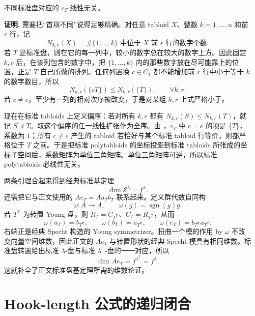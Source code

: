 \begin{lemma}
不同标准盘对应的 $\varepsilon_T$ 线性无关。

\par\smallskip\noindent\textbf{证明.}
需要把“首项不同”说得足够精确。对任意 tabloid $X$、整数 $k=1,\dots,n$ 和前 $r$ 行，记
\[
N_{k,r}(X)=\#\{1,\dots,k\}\text{ 中位于 }X\text{ 前 }r\text{ 行的数字个数}.
\]
若 $T$ 是标准盘，则在它的每一列中，较小的数字总在较大的数字上方。因此固定 $k,r$ 后，在该列包含的数字中，把 $\{1,\dots,k\}$ 内的那些数字放在尽可能靠上的位置，正是 $T$ 自己所做的排列。任何列置换 $c\in C_T$ 都不能增加前 $r$ 行中小于等于 $k$ 的数字数目，所以
\begin{equation}
N_{k,r}(\{cT\})\le N_{k,r}(\{T\}),
\qquad \forall k,r.
\label{eq:tabloid-dominance-triangular}
\end{equation}
若 $c\neq e$，至少有一列的相对次序被改变，于是对某组 $k,r$ 上式严格小于。

现在在标准 tabloids 上定义偏序：若对所有 $k,r$ 都有 $N_{k,r}(S)\le N_{k,r}(T)$，就记 $S\preceq T$。取这个偏序的任一线性扩张作为全序。由 ，$\varepsilon_T$ 中 $c=e$ 的项是 $\{T\}$，系数为 $1$；所有 $c\neq e$ 产生的 tabloid 若恰好与某个标准 tabloid 行等价，则都严格位于 $T$ 之前。于是把标准 polytabloids 的坐标投影到标准 tabloids 所张成的坐标子空间后，系数矩阵为单位三角矩阵。单位三角矩阵可逆，所以标准 polytabloids 必线性无关。
\end{lemma}

两条引理合起来得到经典标准基定理
\begin{equation}
\dim\mathscr S^\lambda=f^\lambda.
\label{eq:standard-polytabloid-dimension-app}
\end{equation}
还需把它与正文使用的 $Ae_T=Aa_Tb_T$ 联系起来。定义群代数自同构
\[
\omega:A\to A,
\qquad
\omega(g)=\operatorname{sgn}(g)g.
\]
若 $T^{\mathsf T}$ 为转置 Young 盘，则 $R_T=C_{T^{\mathsf T}}$、$C_T=R_{T^{\mathsf T}}$，从而
\[
\omega(a_T)=b_{T^{\mathsf T}},
\qquad
\omega(b_T)=a_{T^{\mathsf T}},
\qquad
\omega(e_T)=b_{T^{\mathsf T}}a_{T^{\mathsf T}}.
\]
右端正是经典 Specht 构造的 Young symmetrizer。扭曲一个模的作用 by $\omega$ 不改变向量空间维数，因此正文的 $Ae_T$ 与转置形状的经典 Specht 模具有相同维数。标准盘转置给出标准 $\lambda$-盘与标准 $\lambda^{\mathsf T}$-盘的一一对应，所以
\[
\dim Ae_T=f^{\lambda^{\mathsf T}}=f^\lambda.
\]
这就补全了正文标准盘基定理所需的维数论证。

\section{Hook-length 公式的递归闭合}

